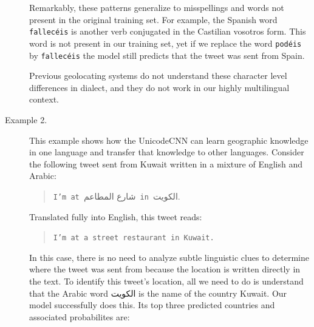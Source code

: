\documentclass[sigconf,anonymous,review,10pt]{acmart}
\newcommand{\str}[1]{\texttt{#1}}
\newcommand{\defn}[1]{\textit{#1}}
\newcommand{\uniloc}{\textsc{UniLoc}}
\begin{document}
\begin{description}
{\noindent
Remarkably, these patterns generalize to misspellings and words not present in the original training set.
For example, the Spanish word \str{fallec\'eis} is another verb conjugated in the Castilian vosotros form.
This word is not present in our training set,
yet if we replace the word \str{pod\'eis} by \str{fallec\'eis} the model still predicts that the tweet was sent from Spain.

\noindent

\noindent
Previous geolocating systems do not understand these character level differences in dialect,
and they do not work in our highly multilingual context.
}



\item[Example 2.]
    This example shows how the UnicodeCNN can learn geographic knowledge in one language and transfer that knowledge to other languages.
Consider the following tweet sent from Kuwait written in a mixture of English and Arabic:
\begin{quote}
\str{I'm at }\foreignlanguage{arabic}{شارع المطاعم}\str{ in }\foreignlanguage{arabic}{الكويت}.%
\end{quote}
Translated fully into English, this tweet reads:
\begin{quote}
    \str{I'm at a street restaurant in Kuwait.}
\end{quote}
In this case, there is no need to analyze subtle linguistic clues to determine where the tweet was sent from because the location is written directly in the text.
To identify this tweet's location, all we need to do is understand that the Arabic word 
\foreignlanguage{arabic}{الكويت}
is the name of the country Kuwait.
Our model successfully does this. 
Its top three predicted countries and associated probabilites are:


\end{description}
\end{document}
